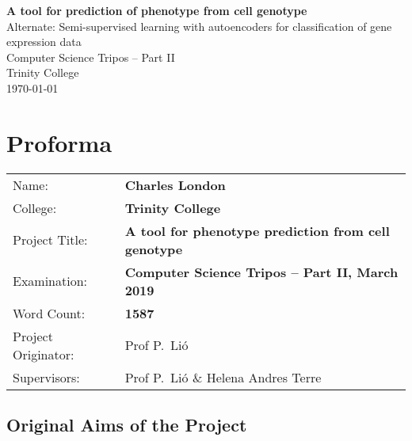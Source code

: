 \documentclass[12pt,a4paper,twoside,openany]{report}
\begin{document}

\pagestyle{empty}


\vspace*{60mm}
\begin{center}
\Huge
\textbf{A tool for prediction of phenotype from cell genotype} \\[5mm]
{\Large Alternate: Semi-supervised learning with autoencoders for classification of gene expression data} \\[5mm]
Computer Science Tripos -- Part II \\[5mm]
Trinity College \\[5mm]
\today  %
\end{center}


\pagestyle{plain}

\chapter*{Proforma}

{\large
\begin{tabular}{ll}
Name:               & \bf Charles London                      \\
College:            & \bf Trinity College                     \\
Project Title:      & \bf A tool for phenotype prediction from cell genotype  \\
Examination:        & \bf Computer Science Tripos -- Part II, March 2019  \\
Word Count:         & \bf 1587\footnotemark[1]  \\
Project Originator: & Prof P.~Li\'o                   \\
Supervisors:         & Prof P.~Li\'o \& Helena Andres Terre                   \\ 
\end{tabular}
}

\section*{Original Aims of the Project}
\end{document}
